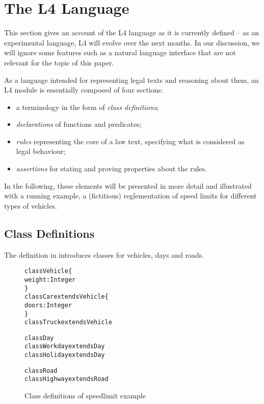 \section{The L4 Language}\label{sec:l4_language}

This section gives an account of the L4 language as it is currently defined --
as an experimental language, L4 will evolve over the next months. In our
discussion, we will ignore some features such as a natural language interface
\cite{} that are not relevant for the topic of this paper.

As a language intended for representing legal texts and reasoning about them,
an L4 module is essentially composed of four sections:
\begin{itemize}
\item a terminology in the form of \emph{class definitions};
\item \emph{declarations} of functions and predicates;
\item \emph{rules} representing the core of a law text, specifying what is
  considered as legal behaviour;
\item \emph{assertions} for stating and proving properties about the rules.
\end{itemize}

In the following, these elements will be presented in more detail and
illustrated with a running example, a (fictitious) reglementation of speed
limits for different types of vehicles.


\subsection{Class Definitions}\label{sec:classdefs}

The definition in  introduces classes for vehicles, days
and roads. 

\begin{figure}[h]
  \begin{framed}
\begin{alltt}
class Vehicle \{
   weight: Integer
\}
class Car extends Vehicle \{
   doors: Integer
\}
class Truck extends Vehicle

class Day
class Workday extends Day
class Holiday extends Day

class Road
class Highway extends Road
\end{alltt}
\end{framed}
  \caption{Class definitions of speedlimit example}\label{fig:classdefs}
\end{figure}

